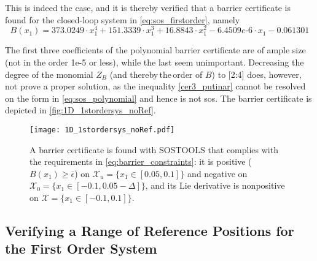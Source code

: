 \vspace{-2mm}
This is indeed the case, and it is thereby verified that a barrier certificate is found for the closed-loop system in \autoref{eq:sos_firstorder}, namely
\vspace{-2mm}
\begin{equation}
B(x_1) = 373.0249\cdot x_1^4 + 151.3339\cdot x_1^3 + 16.8843\cdot x_1^2 - 6.4509e\text{-}6\cdot x_1 - 0.061301
\end{equation}

\vspace{-3mm}
The first three coefficients of the polynomial barrier certificate are of ample size (not in the order 1e-5 or less), while the last seem unimportant. Decreasing the degree of the monomial $Z_B$ (and thereby\,the\,order of $B$) to [2:4] does, however, not prove a proper solution, as the inequality \autoref{cer3_putinar} cannot be resolved on the form in \autoref{eq:sos_polynomial} and hence is not \gls{sos}. The  barrier certificate is depicted in \autoref{fig:1D_1stordersys_noRef}.

\begin{figure}[htbp]
\centering%
\texttt{[image: 1D\_1stordersys\_noRef.pdf]}
	\caption{A barrier certificate is found with SOSTOOLS that complies with the requirements in \autoref{eq:barrier_constraints}: it is positive ($B(x_1)\geq \bar{\epsilon}$) on $\mathcal{X}_u=\{x_1\in [0.05,0.1]\}$ and negative on $\mathcal{X}_0=\{x_1\in [-0.1,0.05-\Delta]\}$, and its Lie derivative is nonpositive on $\mathcal{X}=\{x_1\in [-0.1,0.1]\}$.}
	\label{fig:1D_1stordersys_noRef}
\end{figure}












\subsection{Verifying a Range of Reference Positions for the First Order System}

